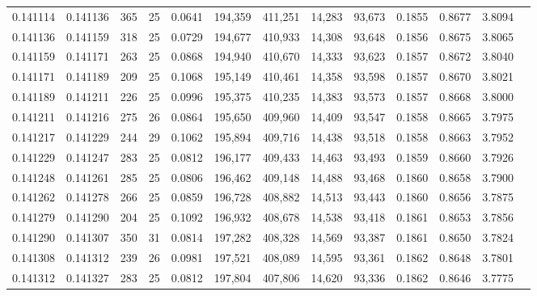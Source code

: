 \begin{tabular}{rrrrrrrrrrrrr}
0.141114 & 0.141136 & 365 &  25 &                                     0.0641 & 194,359 & 411,251 &  14,283 &  93,673 & 0.1855 & 0.8677 & 3.8094 \\
0.141136 & 0.141159 & 318 &  25 &                                     0.0729 & 194,677 & 410,933 &  14,308 &  93,648 & 0.1856 & 0.8675 & 3.8065 \\
0.141159 & 0.141171 & 263 &  25 &                                     0.0868 & 194,940 & 410,670 &  14,333 &  93,623 & 0.1857 & 0.8672 & 3.8040 \\
0.141171 & 0.141189 & 209 &  25 &                                     0.1068 & 195,149 & 410,461 &  14,358 &  93,598 & 0.1857 & 0.8670 & 3.8021 \\
0.141189 & 0.141211 & 226 &  25 &                                     0.0996 & 195,375 & 410,235 &  14,383 &  93,573 & 0.1857 & 0.8668 & 3.8000 \\
0.141211 & 0.141216 & 275 &  26 &                                     0.0864 & 195,650 & 409,960 &  14,409 &  93,547 & 0.1858 & 0.8665 & 3.7975 \\
0.141217 & 0.141229 & 244 &  29 &                                     0.1062 & 195,894 & 409,716 &  14,438 &  93,518 & 0.1858 & 0.8663 & 3.7952 \\
0.141229 & 0.141247 & 283 &  25 &                                     0.0812 & 196,177 & 409,433 &  14,463 &  93,493 & 0.1859 & 0.8660 & 3.7926 \\
0.141248 & 0.141261 & 285 &  25 &                                     0.0806 & 196,462 & 409,148 &  14,488 &  93,468 & 0.1860 & 0.8658 & 3.7900 \\
0.141262 & 0.141278 & 266 &  25 &                                     0.0859 & 196,728 & 408,882 &  14,513 &  93,443 & 0.1860 & 0.8656 & 3.7875 \\
0.141279 & 0.141290 & 204 &  25 &                                     0.1092 & 196,932 & 408,678 &  14,538 &  93,418 & 0.1861 & 0.8653 & 3.7856 \\
0.141290 & 0.141307 & 350 &  31 &                                     0.0814 & 197,282 & 408,328 &  14,569 &  93,387 & 0.1861 & 0.8650 & 3.7824 \\
0.141308 & 0.141312 & 239 &  26 &                                     0.0981 & 197,521 & 408,089 &  14,595 &  93,361 & 0.1862 & 0.8648 & 3.7801 \\
0.141312 & 0.141327 & 283 &  25 &                                     0.0812 & 197,804 & 407,806 &  14,620 &  93,336 & 0.1862 & 0.8646 & 3.7775 \\

\end{tabular}
